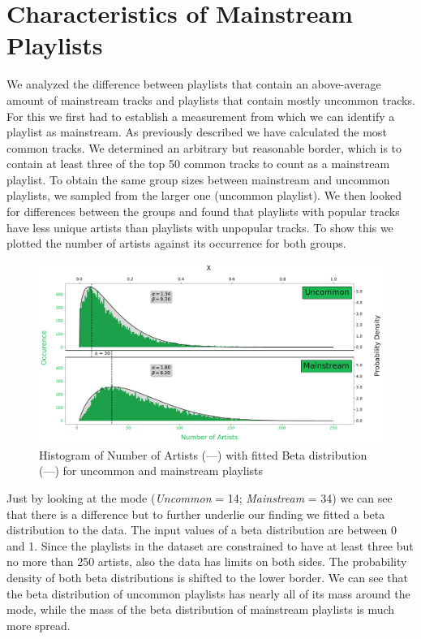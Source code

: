 \section{Characteristics of Mainstream Playlists}
We analyzed the difference between playlists that contain an above-average amount of mainstream tracks and playlists that contain mostly uncommon tracks. For this we first had to establish a measurement from which we can identify a playlist as mainstream. As previously described we have calculated the most common tracks. We determined an arbitrary but reasonable border, which is to contain at least three of the top 50 common tracks to count as a mainstream playlist. To obtain the same group sizes between mainstream and uncommon playlists, we sampled from the larger one (uncommon playlist). We then looked for differences between the groups and found that playlists with popular tracks have less unique artists than playlists with unpopular tracks. To show this we plotted the number of artists against its occurrence for both groups.

\begin{figure}[ht]
    \centering
    \includegraphics[width=\textwidth]{fig/pop_unpop_artist.pdf}
    \caption{Histogram of Number of Artists (\textcolor{spotifygreen}{---}) with fitted Beta distribution (\textcolor{black}{---}) for uncommon and mainstream playlists}
    \label{fig:pop_unppo_artist}
\end{figure}

Just by looking at the mode (\textit{Uncommon} = 14; \textit{Mainstream} = 34) we can see that there is a difference but to further underlie our finding we fitted a beta distribution to the data. The input values of a beta distribution are between 0 and 1. Since the playlists in the dataset are constrained to have at least three but no more than 250 artists, also the data has limits on both sides. The probability density of both beta distributions is shifted to the lower border. We can see that the beta distribution of uncommon playlists has nearly all of its mass around the mode, while the mass of the beta distribution of mainstream playlists is much more spread.

